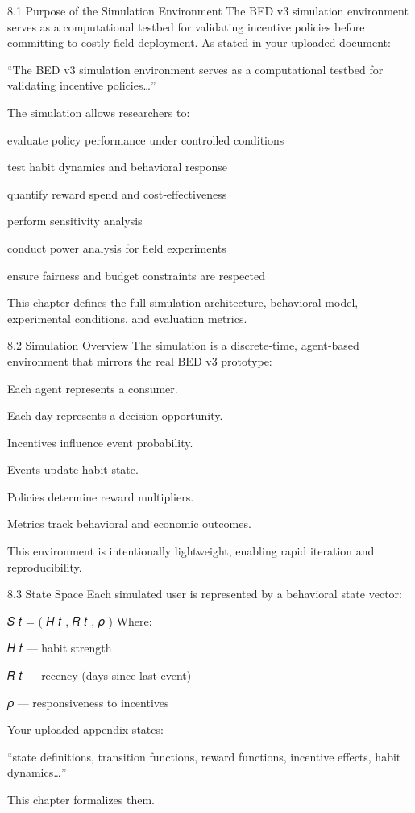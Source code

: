 8.1 Purpose of the Simulation Environment
The BED v3 simulation environment serves as a computational testbed for validating incentive policies before committing to costly field deployment. As stated in your uploaded document:

“The BED v3 simulation environment serves as a computational testbed for validating incentive policies…”

The simulation allows researchers to:

evaluate policy performance under controlled conditions

test habit dynamics and behavioral response

quantify reward spend and cost‑effectiveness

perform sensitivity analysis

conduct power analysis for field experiments

ensure fairness and budget constraints are respected

This chapter defines the full simulation architecture, behavioral model, experimental conditions, and evaluation metrics.

8.2 Simulation Overview
The simulation is a discrete‑time, agent‑based environment that mirrors the real BED v3 prototype:

Each agent represents a consumer.

Each day represents a decision opportunity.

Incentives influence event probability.

Events update habit state.

Policies determine reward multipliers.

Metrics track behavioral and economic outcomes.

This environment is intentionally lightweight, enabling rapid iteration and reproducibility.

8.3 State Space
Each simulated user is represented by a behavioral state vector:

𝑆
𝑡
=
(
𝐻
𝑡
,
𝑅
𝑡
,
𝜌
)
Where:

𝐻
𝑡
 — habit strength

𝑅
𝑡
 — recency (days since last event)

𝜌
 — responsiveness to incentives

Your uploaded appendix states:

“state definitions, transition functions, reward functions, incentive effects, habit dynamics…”

This chapter formalizes them.

